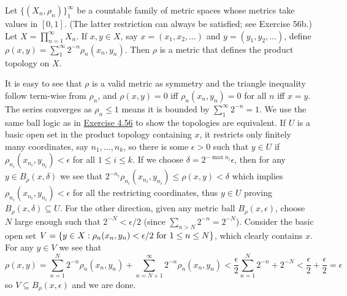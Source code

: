 \documentclass[12pt,a4paper]{article}
\begin{document}
\begin{problem}\label{prob:4-77}
Let $\{(X_n,\rho_n)\}_{1}^\infty$ be a countable family of metric spaces whose metrics take values in $[0,1]$. (The latter restriction can always be satisfied; see Exercise 56b.) Let $X = \prod_{n=1}^\infty X_n$. If $x, y \in X$, say $x = (x_1, x_2, \dots)$ and $y = (y_1, y_2, \dots)$, define $\rho(x,y) = \sum_{1}^\infty 2^{-n} \rho_n(x_n, y_n)$. Then $\rho$ is a metric that defines the product topology on $X$.
\end{problem}
\begin{solution}
    It is easy to see that $\rho$ is a valid metric as symmetry and the triangle inequality follow term-wise from $\rho_n$, and $\rho(x,y)=0$ iff $\rho_n(x_n,y_n)=0$ for all $n$ iff $x=y$.
    The series converges as $\rho_n\leq 1$ means it is bounded by $\sum_1^\infty 2^{-n}=1$.
    We use the same ball logic as in \hyperref[prob:4-56]{Exercise 4.56} to show the topologies are equivalent.
    If $U$ is a basic open set in the product topology containing $x$, it restricts only finitely many coordinates, say $n_1,\ldots,n_k$, so there is some $\epsilon>0$ such that $y\in U$ if $\rho_{n_i}(x_{n_i},y_{n_i})<\epsilon$ for all $1\leq i\leq k$.
    If we choose $\delta=2^{-\max n_i}\epsilon$, then for any $y\in B_\rho(x,\delta)$ we see that $2^{-n_i}\rho_{n_i}(x_{n_i},y_{n_i})\leq\rho(x,y)<\delta$ which implies $\rho_{n_i}(x_{n_i},y_{n_i})<\epsilon$ for all the restricting coordinates, thus $y\in U$ proving $B_\rho(x,\delta) \subseteq U$.
    For the other direction, given any metric ball $B_\rho(x,\epsilon)$, choose $N$ large enough such that $2^{-N}<\epsilon/2$ (since $\sum_{n>N}2^{-n}=2^{-N}$).
    Consider the basic open set $V=\qty{y\in X:\rho_n(x_n,y_n)<\epsilon/2\text{ for }1\leq n\leq N}$, which clearly contains $x$.
    For any $y\in V$ we see that
    \[
        \rho(x,y)=\sum_{n=1}^N 2^{-n}\rho_n(x_n,y_n)+\sum_{n=N+1}^\infty 2^{-n}\rho_n(x_n,y_n)< \frac{\epsilon}{2}\sum_{n=1}^N 2^{-n} + 2^{-N} < \frac{\epsilon}{2}+\frac{\epsilon}{2}=\epsilon
    \]
    so $V \subseteq B_\rho(x,\epsilon)$ and we are done.
\end{solution}
\end{document}
